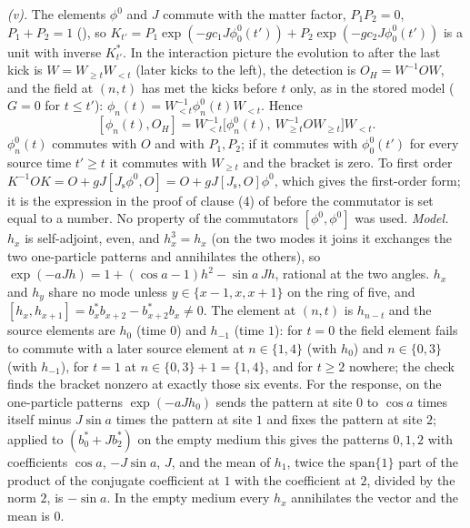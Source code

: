 \emph{(v).} The elements $\phi^{0}$ and $J$ commute with the matter factor, $P_{1}P_{2} = 0$, $P_{1} + P_{2} = 1$ (), so $K_{t'} = P_{1}\exp(-gc_{1}J\phi^{0}_{0}(t')) + P_{2}\exp(-gc_{2}J\phi^{0}_{0}(t'))$ is a unit with inverse $K_{t'}^{*}$. In the interaction picture the evolution to after the last kick is $W = W_{\ge t}W_{<t}$ (later kicks to the left), the detection is $O_{H} = W^{-1}OW$, and the field at $(n, t)$ has met the kicks before $t$ only, as in the stored model ($G = 0$ for $t \le t'$): $\phi_{n}(t) = W_{<t}^{-1}\phi^{0}_{n}(t)W_{<t}$. Hence
\[
[\phi_{n}(t), O_{H}] = W_{<t}^{-1}\bigl[\phi^{0}_{n}(t),\ W_{\ge t}^{-1}OW_{\ge t}\bigr]W_{<t} .
\]
$\phi^{0}_{n}(t)$ commutes with $O$ and with $P_{1}, P_{2}$; if it commutes with $\phi^{0}_{0}(t')$ for every source time $t' \ge t$ it commutes with $W_{\ge t}$ and the bracket is zero. To first order $K^{-1}OK = O + gJ[J_{\mathrm{s}}\phi^{0}, O] = O + gJ[J_{\mathrm{s}}, O]\phi^{0}$, which gives the first-order form; it is the expression in the proof of clause (4) of  before the commutator is set equal to a number. No property of the commutators $[\phi^{0}, \phi^{0}]$ was used. \emph{Model.} $h_{x}$ is self-adjoint, even, and $h_{x}^{3} = h_{x}$ (on the two modes it joins it exchanges the two one-particle patterns and annihilates the others), so $\exp(-aJh) = 1 + (\cos a - 1)h^{2} - \sin a\,Jh$, rational at the two angles. $h_{x}$ and $h_{y}$ share no mode unless $y \in \{x - 1, x, x + 1\}$ on the ring of five, and $[h_{x}, h_{x+1}] = b_{x}^{*}b_{x+2} - b_{x+2}^{*}b_{x} \ne 0$. The element at $(n, t)$ is $h_{n-t}$ and the source elements are $h_{0}$ (time $0$) and $h_{-1}$ (time $1$): for $t = 0$ the field element fails to commute with a later source element at $n \in \{1, 4\}$ (with $h_{0}$) and $n \in \{0, 3\}$ (with $h_{-1}$), for $t = 1$ at $n \in \{0, 3\} + 1 = \{1, 4\}$, and for $t \ge 2$ nowhere; the check finds the bracket nonzero at exactly those six events. For the response, on the one-particle patterns $\exp(-aJh_{0})$ sends the pattern at site $0$ to $\cos a$ times itself minus $J\sin a$ times the pattern at site $1$ and fixes the pattern at site $2$; applied to $(b_{0}^{*} + Jb_{2}^{*})$ on the empty medium this gives the patterns $0, 1, 2$ with coefficients $\cos a$, $-J\sin a$, $J$, and the mean of $h_{1}$, twice the $\mathrm{span}\{1\}$ part of the product of the conjugate coefficient at $1$ with the coefficient at $2$, divided by the norm $2$, is $-\sin a$. In the empty medium every $h_{x}$ annihilates the vector and the mean is $0$.


